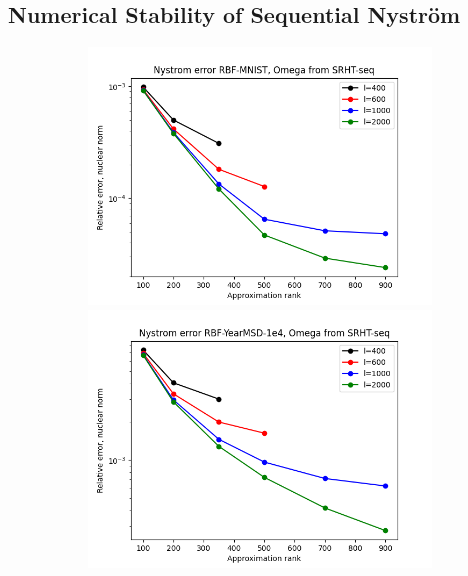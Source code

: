 \documentclass{article}
\theoremstyle{definition}
\begin{document}
\clearpage{}
\printbibliography{} %
\clearpage
\begin{appendices}
\section{Numerical Stability of Sequential Nyström}
\begin{figure}
\centering
\hfill\begin{subfigure}[t]{\textwidth+20pt\relax}
    \includegraphics[width=\dimexpr\linewidth-20pt\relax]{plots/relerror/relerror_RBF-MNIST_SRHT-seq.png}
    \includegraphics[width=\dimexpr\linewidth-20pt\relax]{plots/relerror/relerror_RBF-YearMSD-1e4_SRHT-seq.png}

\end{subfigure}
\end{figure}
\end{appendices}
\end{document}
